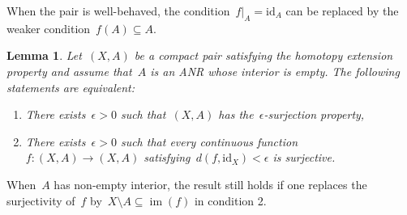 \documentclass[english,11pt]{article}
\theoremstyle{plain}
\newtheorem{lemma}{Lemma}[section]
\theoremstyle{remark}
\theoremstyle{definition}
\newcommand{\id}{\mathrm{id}}
\newcommand{\im}{\mathop{\mathrm{im}}}
\begin{document}
When the pair is well-behaved, the condition~$f|_A=\id_A$ can be replaced by the weaker condition~$f(A)\subseteq A$.

\begin{lemma}\label{lem_id_vs_contained}
Let~$(X,A)$ be a compact pair satisfying the homotopy extension property and assume that~$A$ is an ANR whose interior is empty. The following statements are equivalent:
\begin{enumerate}
\item There exists~$\epsilon>0$ such that~$(X,A)$ has the~$\epsilon$-surjection property,
\item There exists~$\epsilon>0$ such that every continuous function~$f:(X,A)\to (X,A)$ satisfying~$d(f,\id_X)<\epsilon$ is surjective.
\end{enumerate}
\end{lemma}
When~$A$ has non-empty interior, the result still holds if one replaces the surjectivity of~$f$ by~$X\setminus A\subseteq\im(f)$ in condition 2.
\end{document}
